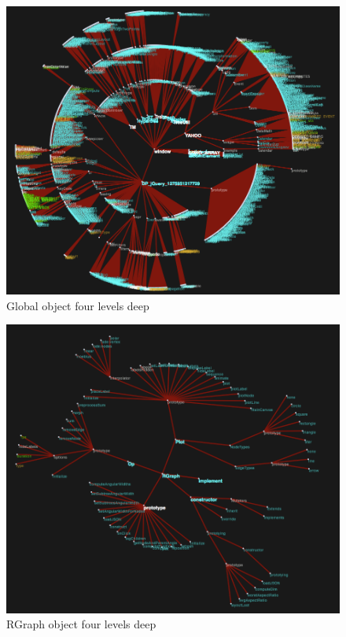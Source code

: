 \documentclass[]{article}
\begin{document}
\begin{figure}[h]
  \begin{center}
    \includegraphics[scale=.2]{deep-window.png}
  \end{center}
  \caption{Global object four levels deep}
  \label{fig:deep-window}
\end{figure}

\begin{figure}[h]
  \begin{center}
    \includegraphics[scale=.2]{rgraph.png}
  \end{center}
  \caption{RGraph object four levels deep}
  \label{fig:rgraph}
\end{figure}
\end{document}
